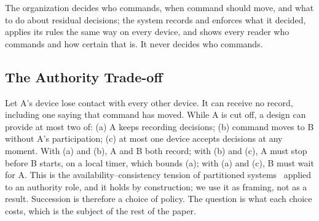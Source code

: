 The organization decides who commands, when command should move, and what to do about
residual decisions; the system records and enforces what it decided, applies its rules the
same way on every device, and shows every reader who commands and how certain that is. It
never decides who commands.

\subsection{The Authority Trade-off}
\label{sec:tradeoff}

Let A's device lose contact with every other device. It can receive no record, including
one saying that command has moved. While A is cut off, a design can provide at most two of:
(a) A keeps recording decisions; (b) command moves to B without A's participation;
(c) at most one device accepts decisions at any moment. With (a) and (b), A and B both
record; with (b) and (c), A must stop before B starts, on a local timer, which bounds (a);
with (a) and (c), B must wait for A. This is the availability--consistency tension of
partitioned systems~\cite{davidson1985consistency,gilbert2002cap,brewer2012cap} applied to
an authority role, and it holds by construction; we use it as framing, not as a result.
Succession is therefore a choice of policy. The question is what each choice costs, which
is the subject of the rest of the paper.
